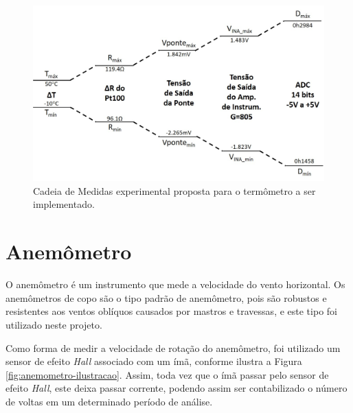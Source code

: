\documentclass[a4paper]{instrumentacao}
\begin{document}
\begin{figure}[H]
	\centering \includegraphics[width=\textwidth]{termometro-cadeia-medidas-proposta2.jpg}
	\caption{Cadeia de Medidas experimental proposta para o termômetro a ser implementado.}
	\label{fig:termometro-cadeia-medidas-proposta}
\end{figure}

\section{Anemômetro}
O anemômetro é um instrumento que mede a velocidade do vento horizontal. Os anemômetros de copo são o tipo padrão de anemômetro, pois são robustos e resistentes aos ventos oblíquos causados por mastros e travessas, e este tipo foi utilizado neste projeto.


Como forma de medir a velocidade de rotação do anemômetro, foi utilizado um sensor de efeito \textit{Hall} associado com um ímã, conforme ilustra a Figura \ref{fig:anemometro-ilustracao}. Assim, toda vez que o ímã passar pelo sensor de efeito \textit{Hall}, este deixa passar corrente, podendo assim ser contabilizado o número de voltas em um determinado período de análise.
\end{document}
